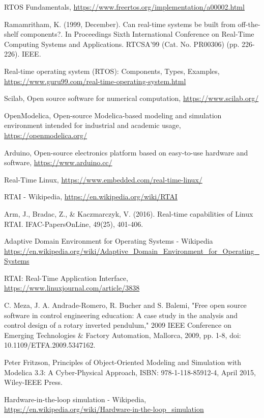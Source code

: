 \documentclass[12pt]{report}
\begin{document}
\begin{thebibliography}{111}
RTOS Fundamentals, \url{https://www.freertos.org/implementation/a00002.html}

Ramamritham, K. (1999, December). Can real-time systems be built from off-the-shelf components?. In Proceedings Sixth International Conference on Real-Time Computing Systems and Applications. RTCSA'99 (Cat. No. PR00306) (pp. 226-226). IEEE.

Real-time operating system (RTOS): Components, Types, Examples, \url{https://www.guru99.com/real-time-operating-system.html}

Scilab, Open source software for numerical computation, \url{https://www.scilab.org/}

OpenModelica, Open-source Modelica-based modeling and simulation environment intended for industrial and academic usage, \url{https://openmodelica.org/}

Arduino, Open-source electronics platform based on easy-to-use hardware and software, \url{https://www.arduino.cc/}

Real-Time Linux, \url{https://www.embedded.com/real-time-linux/}

RTAI - Wikipedia, \url{https://en.wikipedia.org/wiki/RTAI} 

Arm, J., Bradac, Z., \& Kaczmarczyk, V. (2016). Real-time capabilities of Linux RTAI. IFAC-PapersOnLine, 49(25), 401-406.

Adaptive Domain Environment for Operating Systems - Wikipedia \url{https://en.wikipedia.org/wiki/Adaptive_Domain_Environment_for_Operating_Systems}

RTAI: Real-Time Application Interface, \url{https://www.linuxjournal.com/article/3838}

C. Meza, J. A. Andrade-Romero, R. Bucher and S. Balemi, "Free open source software in control engineering education: A case study in the analysis and control design of a rotary inverted pendulum," 2009 IEEE Conference on Emerging Technologies \& Factory Automation, Mallorca, 2009, pp. 1-8, doi: 10.1109/ETFA.2009.5347162.

Peter Fritzson, Principles of Object-Oriented Modeling and Simulation with Modelica 3.3: A Cyber-Physical Approach, ISBN: 978-1-118-85912-4, April 2015, Wiley-IEEE Press. 

Hardware-in-the-loop simulation - Wikipedia, \url{https://en.wikipedia.org/wiki/Hardware-in-the-loop_simulation}


\end{thebibliography}
\end{document}

